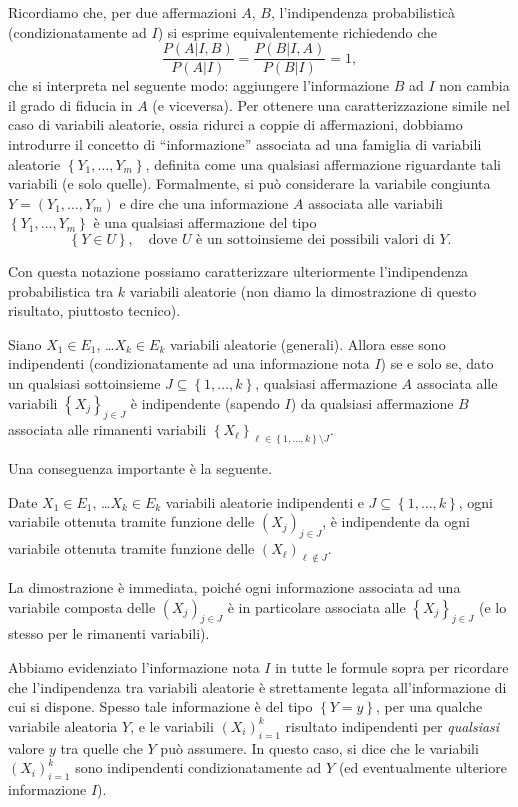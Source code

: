 \documentclass[
  italian,
  letterpaper,
]{book}
\newcommand{\cur}[1]{\left\{ #1 \right\}}
\theoremstyle{definition}
\theoremstyle{remark}
\begin{document}
Ricordiamo che, per due affermazioni \(A\), \(B\), l'indipendenza
probabilisticà (condizionatamente ad \(I\)) si esprime equivalentemente
richiedendo che
\[ \frac{ P(A| I, B)}{P(A|I)} = \frac{P(B|I,A)}{P(B|I)} =1,\] che si
interpreta nel seguente modo: aggiungere l'informazione \(B\) ad \(I\)
non cambia il grado di fiducia in \(A\) (e viceversa). Per ottenere una
caratterizzazione simile nel caso di variabili aleatorie, ossia ridurci
a coppie di affermazioni, dobbiamo introdurre il concetto di
``informazione'' associata ad una famiglia di variabili aleatorie
\(\cur{Y_1, \ldots, Y_m}\), definita come una qualsiasi affermazione
riguardante tali variabili (e solo quelle). Formalmente, si può
considerare la variabile congiunta \(Y = (Y_1, \ldots, Y_m)\) e dire che
una informazione \(A\) associata alle variabili
\(\cur{Y_1, \ldots, Y_m}\) è una qualsiasi affermazione del tipo
\[\cur{Y \in U}, \quad \text{dove $U$ è un sottoinsieme dei possibili valori di $Y$.}\]

Con questa notazione possiamo caratterizzare ulteriormente
l'indipendenza probabilistica tra \(k\) variabili aleatorie (non diamo
la dimostrazione di questo risultato, piuttosto tecnico).

Siano \(X_1\in E_1\), \ldots \(X_k\in E_k\) variabili aleatorie
(generali). Allora esse sono indipendenti (condizionatamente ad una
informazione nota \(I\)) se e solo se, dato un qualsiasi sottoinsieme
\(J \subseteq \cur{1, \ldots, k}\), qualsiasi affermazione \(A\)
associata alle variabili \(\cur{X_j}_{j \in J}\) è indipendente (sapendo
\(I\)) da qualsiasi affermazione \(B\) associata alle rimanenti
variabili \(\cur{X_\ell}_{\ell \in \cur{1, \ldots, k}\setminus J}\).

Una conseguenza importante è la seguente.

Date \(X_1\in E_1\), \ldots \(X_k\in E_k\) variabili aleatorie
indipendenti e \(J \subseteq \cur{1, \ldots, k}\), ogni variabile
ottenuta tramite funzione delle \((X_j)_{j \in J}\), è indipendente da
ogni variabile ottenuta tramite funzione delle
\((X_\ell)_{\ell \notin J}\).

La dimostrazione è immediata, poiché ogni informazione associata ad una
variabile composta delle \((X_j)_{j \in J}\) è in particolare associata
alle \(\cur{X_j}_{j \in J}\) (e lo stesso per le rimanenti variabili).

Abbiamo evidenziato l'informazione nota \(I\) in tutte le formule sopra
per ricordare che l'indipendenza tra variabili aleatorie è strettamente
legata all'informazione di cui si dispone. Spesso tale informazione è
del tipo \(\cur{Y=y}\), per una qualche variabile aleatoria \(Y\), e le
variabili \((X_i)_{i=1}^k\) risultato indipendenti per \emph{qualsiasi}
valore \(y\) tra quelle che \(Y\) può assumere. In questo caso, si dice
che le variabili \((X_i)_{i=1}^k\) sono indipendenti condizionatamente
ad \(Y\) (ed eventualmente ulteriore informazione \(I\)).
\end{document}
